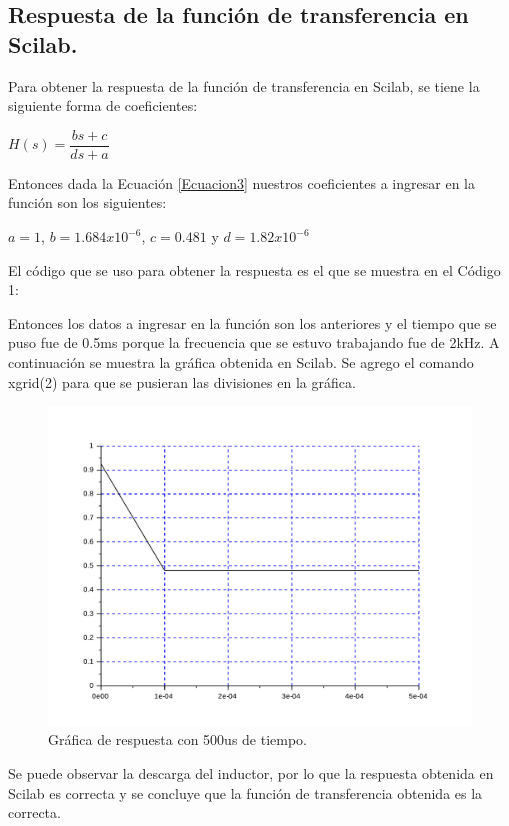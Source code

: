 \documentclass[12pt,a4paper]{article}
\newcounter{ns}
\begin{document}
\subsection{Respuesta de la función de transferencia en Scilab.}
Para obtener la respuesta de la función de transferencia en Scilab, se tiene la siguiente forma de coeficientes:
\begin{center}
$H(s)=\dfrac{bs+c}{ds+a}$
\end{center}
Entonces dada la Ecuación \ref{Ecuacion3} nuestros coeficientes a ingresar en la función son los siguientes:\\
\begin{center}
$a = 1$, $b = 1.684x10^{-6}$, $c = 0.481$ y $d=1.82x10^{-6}$  
\end{center}
El código que se uso para obtener la respuesta es el que se muestra en el Código 1:\\
\begin{center}

\end{center}
Entonces los datos a ingresar en la función son los anteriores y el tiempo que se puso fue de 0.5ms porque la frecuencia que se estuvo trabajando fue de 2kHz. A continuación se muestra la gráfica obtenida en Scilab. Se agrego el comando xgrid(2) para que se pusieran las divisiones en la gráfica.
\newpage
\begin{figure}[h!]
\centering
\includegraphics[scale=0.5]{Grafica.pdf}
\caption{Gráfica de respuesta con 500us de tiempo.}
\label{Figura2}
\end{figure}
Se puede observar la descarga del inductor, por lo que la respuesta obtenida en Scilab es correcta y se concluye que la función de transferencia obtenida es la correcta.
\end{document}
